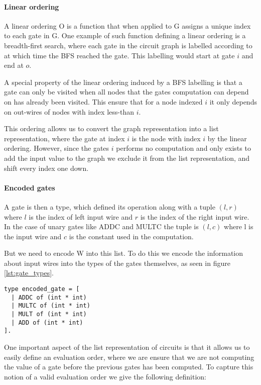 

\paragraph{Linear ordering}
A linear ordering O is a function that when applied to G assigns a unique
index to each gate in G.
One example of such function defining a linear ordering is a breadth-first
search, where each gate in the circuit graph is labelled according to at which
time the BFS reached the gate.
This labelling would start at gate $i$ and end at $o$.

A special property of the linear ordering induced by a BFS labelling is that a
gate can only be visited when all nodes that the gates computation can depend on
has already been visited. This ensure that for a node indexed $i$ it only
depends on out-wires of nodes with index less-than $i$.

This ordering allows us to convert the graph representation into a list
representation, where the gate at index $i$ is the node with index $i$ by the
linear ordering. However, since the gates $i$ performs no computation and only
exists to add the input value to the graph we exclude it from the list
representation, and shift every index one down.

\paragraph{Encoded gates}
A gate is then a type, which defined its operation along
with a tuple $(l,r)$ where $l$ is the index of left input wire and $r$ is the
index of the right input wire. In the case of unary gates like ADDC and MULTC
the tuple is $(l, c)$ where l is the input wire and $c$ is the constant used in
the computation.

But we need to encode W into this list. To do this we encode the information
about input wires into the types of the gates themselves, as seen in figure
\ref{lst:gate_types}.

\begin{lstlisting}[float,label=lst:gate_types,caption=Type declaration of gates]
type encoded_gate = [
  | ADDC of (int * int)
  | MULTC of (int * int)
  | MULT of (int * int)
  | ADD of (int * int)
].
\end{lstlisting}
\vspace{2mm}
\noindent
One important aspect of the list representation of circuits is that it allows
us to easily define an evaluation order, where we are ensure that we are not
computing the value of a gate before the previous gates has been computed. To
capture this notion of a valid evaluation order we give the following definition:

